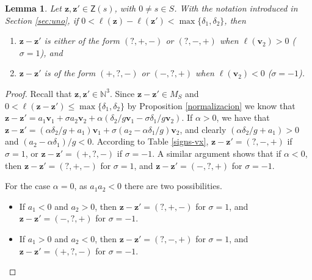 \documentclass[11pt]{amsart}
\newtheorem{lemma}[theorem]{Lemma}
\theoremstyle{remark}
\begin{document}
\begin{lemma}
Let $\mathbf z,\mathbf z'\in\mathsf Z(s)$, with $0\neq s\in S$. With the notation introduced in Section \ref{sec:uno}, if $0<\ell(\mathbf z)-\ell(\mathbf z')<\max\{\delta_1,\delta_2\} $, then
 \begin{enumerate}
 \item $\mathbf z-\mathbf z'$ is either of the form $(?,+,-)$ or $(?,-,+)$ when $\ell(\mathbf v_2)>0$ ($\sigma=1$), and
 \item $\mathbf z-\mathbf z'$ is of the form $(+,?,-)$ or $(-,?,+)$ when $\ell(\mathbf v_2)<0$ ($\sigma=-1$).
 \end{enumerate}
 \end{lemma}
\begin{proof} 
Recall that  $\mathbf z,\mathbf z'\in\mathbb N^3$. Since $\mathbf z-\mathbf z'\in M_S$ and $0<\ell(\mathbf z-\mathbf z')\le \max\{\delta_1,\delta_2\}$ by Proposition \ref{normalizacion} we know that $\mathbf z-\mathbf z'=a_1\mathbf v_1+\sigma a_2\mathbf v_2+\alpha(\delta_2/g\mathbf v_1-\sigma\delta_1/g\mathbf v_2)$. If $\alpha>0$, we have that $\mathbf z-\mathbf z'=(\alpha\delta_2/g+a_1)\mathbf v_1+\sigma(a_2-\alpha\delta_1/g)\mathbf v_2$, and clearly $(\alpha\delta_2/g+a_1)>0$ and $(a_2-\alpha\delta_1)/g<0$. According to Table \ref{signs-vx}, $\mathbf z-\mathbf z'=(?,-,+)$ if $\sigma=1$, or $\mathbf z-\mathbf z'=(+,?,-)$ if $\sigma=-1$. A similar argument shows that if $\alpha<0$, then $\mathbf z-\mathbf z'=(?,+,-)$ for $\sigma=1$, and $\mathbf z-\mathbf z'=(-,?,+)$ for $\sigma=-1$.

For the case $\alpha=0$, as $a_1a_2<0$ there are two possibilities.
 \begin{itemize}
 \item If $a_1<0$ and $a_2>0$, then $\mathbf z-\mathbf z'=(?,+,-)$ for $\sigma=1$, and $\mathbf z-\mathbf z'=(-,?,+)$ for $\sigma=-1$.
 \item If $a_1>0$ and $a_2<0$, then $\mathbf z-\mathbf z'=(?,-,+)$ for $\sigma=1$, and $\mathbf z-\mathbf z'=(+,?,-)$ for $\sigma=-1$.\qedhere
 \end{itemize}
\end{proof}
\end{document}
